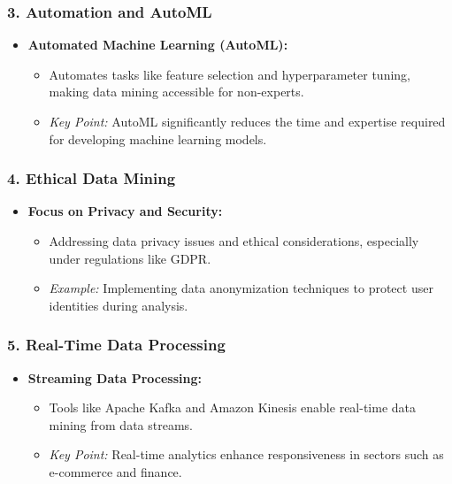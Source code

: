 \documentclass{beamer}
\begin{document}
\begin{frame}[fragile]
    \frametitle{3. Automation and AutoML}
    \begin{itemize}
        \item \textbf{Automated Machine Learning (AutoML):} 
        \begin{itemize}
            \item Automates tasks like feature selection and hyperparameter tuning, making data mining accessible for non-experts.
            \item \textit{Key Point:} AutoML significantly reduces the time and expertise required for developing machine learning models.
        \end{itemize}
    \end{itemize}
\end{frame}

\begin{frame}[fragile]
    \frametitle{4. Ethical Data Mining}
    \begin{itemize}
        \item \textbf{Focus on Privacy and Security:} 
        \begin{itemize}
            \item Addressing data privacy issues and ethical considerations, especially under regulations like GDPR.
            \item \textit{Example:} Implementing data anonymization techniques to protect user identities during analysis.
        \end{itemize}
    \end{itemize}
\end{frame}

\begin{frame}[fragile]
    \frametitle{5. Real-Time Data Processing}
    \begin{itemize}
        \item \textbf{Streaming Data Processing:} 
        \begin{itemize}
            \item Tools like Apache Kafka and Amazon Kinesis enable real-time data mining from data streams.
            \item \textit{Key Point:} Real-time analytics enhance responsiveness in sectors such as e-commerce and finance.
        \end{itemize}
    \end{itemize}
\end{frame}
\end{document}
